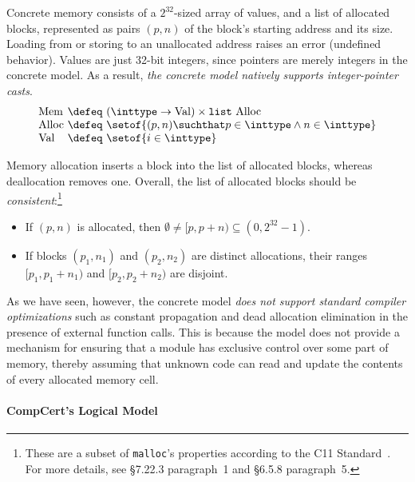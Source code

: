 Concrete memory consists of a $2^{32}$-sized array of values, and a
list of allocated blocks, 
represented as pairs $(p,n)$ of the block's starting address and its size.
Loading from or storing to an unallocated address raises
an error (\ie undefined behavior).  Values are just 32-bit integers,
since pointers are merely integers in the concrete model.
As a result, \emph{the concrete model natively supports integer-pointer casts}.
\[
\begin{array}{@{}l@{~}c@{~}l@{}}
\mathrm{Mem} &\defeq& (\inttype \to \mathrm{Val}) \times \mathtt{list}\ \mathrm{Alloc} \\
\mathrm{Alloc} &\defeq& \setof{(p,n) \suchthat p \in \inttype \land n \in \inttype} \\
\mathrm{Val} &\defeq& \setof{i\in\inttype}
\end{array}
\]

Memory allocation inserts a block into the list of allocated blocks, 
whereas deallocation removes one.  Overall, the list of allocated 
blocks should be \emph{consistent}:\footnote{These are a subset of 
  \texttt{malloc}'s properties according to the C11 Standard~\cite{iso2011iec}. 
  For more details, see \S7.22.3 paragraph~1 and \S6.5.8 paragraph~5.}
\begin{itemize}
\item If $(p, n)$ is allocated, then $\emptyset \neq [p,p+n) \subseteq
  (0,2^{32}-1)$.
\item If blocks $(p_1, n_1)$ and $(p_2, n_2)$ are distinct
  allocations, their ranges $[p_1,p_1+n_1)$ and $[p_2,p_2+n_2)$
  are disjoint.
\end{itemize}

As we have seen, however, the concrete model \emph{does not support 
standard compiler optimizations} such as constant propagation and 
dead allocation elimination in the presence of external function
calls.  This is because the model does not provide 
a mechanism for ensuring that a module has exclusive control over some
part of memory, thereby assuming that unknown code can read and 
update the contents of every allocated memory cell.


\paragraph{CompCert's Logical Model}


